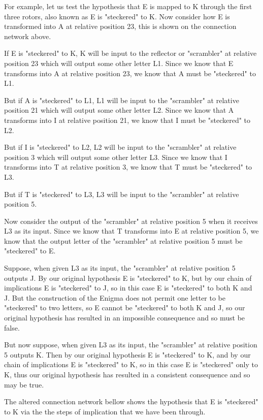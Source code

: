 \documentclass[12pt,a4paper]{article}
\begin{document}
For example, let us test the hypothesis that E is mapped to K through the first three rotors, also known as E is "steckered" to K. Now consider how E is transformed into A at relative position 23, this is shown on the connection network above.

If E is "steckered" to K, K will be input to the reflector or "scrambler" at relative position 23 which will output some other letter L1. Since we know that E transforms into A at relative position 23, we know that A must be "steckered" to L1.

But if A is "steckered" to L1, L1 will be input to the "scrambler" at relative position 21 which will output some other letter L2. Since we know that A transforms into I at relative position 21, we know that I must be "steckered" to L2.

But if I is "steckered" to L2, L2 will be input to the "scrambler" at relative position 3 which will output some other letter L3. Since we know that I transforms into T at relative position 3, we know that T must be "steckered" to L3.

But if T is "steckered" to L3, L3 will be input to the "scrambler" at relative position 5.

Now consider the output of the "scrambler" at relative position 5 when it receives L3 as its input. Since we know that T transforms into E at relative position 5, we know that the output letter of the "scrambler" at relative position 5 must be "steckered" to E.

Suppose, when given L3 as its input, the "scrambler" at relative position 5 outputs J. By our original hypothesis E is "steckered" to K, but by our chain of implications E is "steckered" to J, so in this case E is "steckered" to both K and J. But the construction of the Enigma does not permit one letter to be "steckered" to two letters, so E cannot be "steckered" to both K and J, so our original hypothesis has resulted in an impossible consequence and so must be false.

But now suppose, when given L3 as its input, the "scrambler" at relative position 5 outputs K. Then by our original hypothesis E is "steckered" to K, and by our chain of implications E is "steckered" to K, so in this case E is "steckered" only to K, thus our original hypothesis has resulted in a consistent consequence and so may be true.

The altered connection network bellow shows the hypothesis that E is "steckered" to K via the the steps of implication that we have been through.
\end{document}
